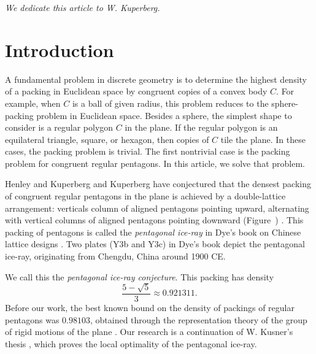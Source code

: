 \def\threepentnoD#1#2#3#4#5#6#7#8#9{%
\pen{#1}{#2}{#3};
\pen{#4}{#5}{#6};
\pen{#7}{#8}{#9}
}

\def\blankfig#1{\tikzfig{#1}{Insert graphic}
{
[scale=1]
\draw(0,) circle(1cm);
}}



\centerline{\it We dedicate this article to W. Kuperberg.}

\section{Introduction}\label{sec:intro} 

A fundamental problem in discrete geometry is to determine the highest
density of a packing in Euclidean space by congruent copies of a
convex body $C$.  For example, when $C$ is a ball of given radius,
this problem reduces to the sphere-packing problem in Euclidean space.
Besides a sphere, the simplest shape to consider is a regular polygon
$C$ in the plane.  If the regular polygon is an equilateral
triangle, square, or hexagon, then copies of $C$ tile the plane.  In
these cases, the packing problem is trivial.  The first nontrivial
case is the packing problem for congruent regular pentagons.  In this
article, we solve that problem.

Henley and Kuperberg and Kuperberg have conjectured that the densest
packing of congruent regular pentagons in the plane is achieved by a
double-lattice arrangement: verticals column of aligned pentagons
pointing upward, alternating with vertical columns of aligned
pentagons pointing downward (Figure~)
\cite{Kup} \cite[p.801]{henley}.  This packing of pentagons is called
the {\it pentagonal ice-ray} in Dye's book on Chinese lattice designs
\cite{dye}.  Two plates (Y3b and Y3c) in Dye's book depict the
pentagonal ice-ray, originating from Chengdu, China around 1900 CE.

 We call this the {\it pentagonal ice-ray  conjecture}.
This packing has density
\[
\frac{5 - \sqrt{5}}3 \approx 0.921311.
\] %
Before our work, the best known bound on the density of packings of
regular pentagons was $0.98103$, obtained through the representation
theory of the group of rigid motions of the plane \cite{Val}.  Our
research is a continuation of W. Kusner's thesis \cite{Kus}, which
proves the local optimality of the pentagonal ice-ray.


